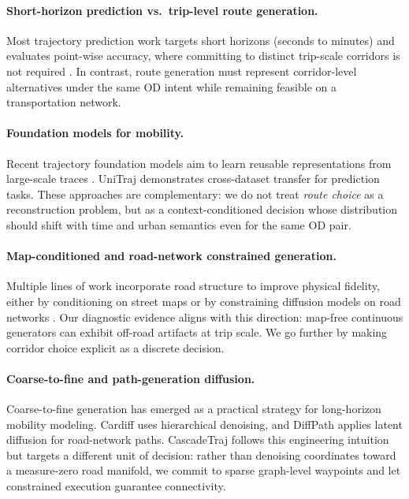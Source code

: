 
\paragraph{Short-horizon prediction vs.\ trip-level route generation.}
Most trajectory prediction work targets short horizons (seconds to minutes) and evaluates point-wise accuracy, where committing to distinct trip-scale corridors is not required \citep{gupta2018social,salzmann2020trajectronpp}.
In contrast, route generation must represent corridor-level alternatives under the same OD intent while remaining feasible on a transportation network.

\paragraph{Foundation models for mobility.}
Recent trajectory foundation models aim to learn reusable representations from large-scale traces \citep{lin2024trajfm}.
UniTraj \citep{unitraj2025} demonstrates cross-dataset transfer for prediction tasks.
These approaches are complementary: we do not treat \emph{route choice} as a reconstruction problem, but as a context-conditioned decision whose distribution should shift with time and urban semantics even for the same OD pair.

\paragraph{Map-conditioned and road-network constrained generation.}
Multiple lines of work incorporate road structure to improve physical fidelity, either by conditioning on street maps \citep{ijcai2025p1041} or by constraining diffusion models on road networks \citep{wei2024diffrntraj,zhu2024controltraj,yang2025geo}.
Our diagnostic evidence aligns with this direction: map-free continuous generators can exhibit off-road artifacts at trip scale.
We go further by making corridor choice explicit as a discrete decision.

\paragraph{Coarse-to-fine and path-generation diffusion.}
Coarse-to-fine generation has emerged as a practical strategy for long-horizon mobility modeling.
Cardiff \citep{guo2025cardiff} uses hierarchical denoising, and DiffPath \citep{fan2024diffpath} applies latent diffusion for road-network paths.
CascadeTraj follows this engineering intuition but targets a different unit of decision: rather than denoising coordinates toward a measure-zero road manifold, we commit to sparse graph-level waypoints and let constrained execution guarantee connectivity.

